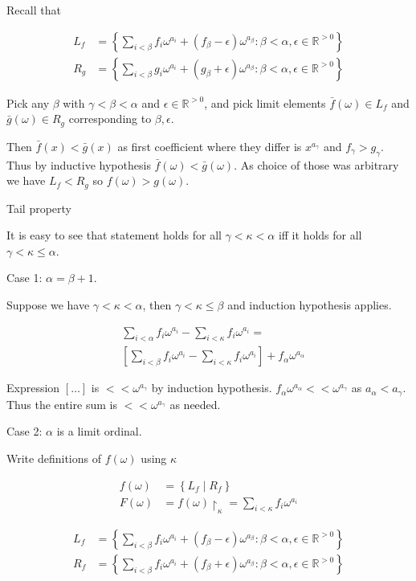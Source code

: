 \documentclass{article}
\newcommand{\brac}[1]{\left[ #1 \right]}
\newcommand{\curly}[1]{\left\{ #1 \right\}}
\newcommand{\R}{\mathbb{R}}
\newcommand{\w}{\omega}
\newcommand{\midr}[1]{\restriction_{#1}}
\begin{document}
Recall that

\begin{align*}
  L_f &= \curly{\sum_{i < \beta} f_i \w^{a_i} + (f_\beta - \epsilon) \w^{a_\beta}
	\colon \beta < \alpha, \epsilon \in \R^{>0}} \\
  R_g &= \curly{\sum_{i < \beta} g_i \w^{a_i} + (g_\beta + \epsilon) \w^{a_\beta}
	\colon \beta < \alpha, \epsilon \in \R^{>0}}
\end{align*}

Pick any $\beta$ with $\gamma < \beta < \alpha$ and $\epsilon \in \R^{>0}$,
and pick limit elements $\bar f(\w) \in L_f$ and $\bar g(\w) \in R_g$ corresponding to $\beta, \epsilon$.

Then $\bar f(x) < \bar g(x)$ as first coefficient where they differ is $x^{a_\gamma}$ and $f_\gamma > g_\gamma$.
Thus by inductive hypothesis $\bar f(\w) < \bar g(\w)$.
As choice of those was arbitrary we have $L_f < R_g$ so $f(\w) > g(\w)$.

Tail property

It is easy to see that statement holds for all $\gamma < \kappa < \alpha$ iff it holds for all $\gamma < \kappa \leq \alpha$.

Case 1: $\alpha = \beta + 1$.

Suppose we have $\gamma < \kappa < \alpha$, then $\gamma < \kappa \leq \beta$ and induction hypothesis applies.

\begin{align*}
	&\sum_{i < \alpha} f_i \w^{a_i} - \sum_{i < \kappa} f_i \w^{a_i} = \\
	&\brac{\sum_{i < \beta} f_i \w^{a_i} - \sum_{i < \kappa} f_i \w^{a_i}} + f_\alpha \w^{a_\alpha}
\end{align*}

Expression $\brac{\ldots}$ is $<< \w^{a_\gamma}$ by induction hypothesis. $f_\alpha \w^{a_\alpha} << \w^{a_\gamma}$ as $a_\alpha < a_\gamma$. Thus the entire sum is $<< \w^{a_\gamma}$ as needed.

Case 2: $\alpha$ is a limit ordinal.

Write definitions of $f(\w)$ using $\kappa$

\begin{align*}
  f(\w) &= \curly{L_f \mid R_f} \\
  F(\w) &= f(\w)\midr\kappa = \sum_{i < \kappa} f_i \w^{a_i}
\end{align*}

\begin{align*}
  L_f &= \curly{\sum_{i < \beta} f_i \w^{a_i} + (f_\beta - \epsilon) \w^{a_\beta}
	\colon \beta < \alpha, \epsilon \in \R^{>0}} \\
  R_f &= \curly{\sum_{i < \beta} f_i \w^{a_i} + (f_\beta + \epsilon) \w^{a_\beta}
	\colon \beta < \alpha, \epsilon \in \R^{>0}} \\
\end{align*}
\end{document}

